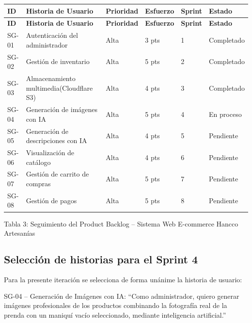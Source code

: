 \documentclass[12pt,a4paper]{article}
\begin{document}
{\small
\begin{longtable}{p{1.2cm} p{6.8cm} p{1.6cm} p{1.8cm} p{1.4cm} p{2.2cm}}
\toprule
\textbf{ID} & \textbf{Historia de Usuario} & \textbf{Prioridad} & \textbf{Esfuerzo} & \textbf{Sprint} & \textbf{Estado} \\
\midrule
\endfirsthead

\toprule
\textbf{ID} & \textbf{Historia de Usuario} & \textbf{Prioridad} & \textbf{Esfuerzo} & \textbf{Sprint} & \textbf{Estado} \\
\midrule
\endhead

\bottomrule
\endlastfoot

SG-01 & Autenticación del administrador & Alta & 3 pts & 1 & Completado \\
SG-02 & Gestión de inventario & Alta & 5 pts & 2 & Completado \\
SG-03 & Almacenamiento multimedia(Cloudflare S3) & Alta & 4 pts & 3 & Completado \\
SG-04 & Generación de imágenes con IA & Alta & 5 pts & 4 & En proceso \\
SG-05 & Generación de descripciones con IA & Alta & 4 pts & 5 & Pendiente \\
SG-06 & Visualización de catálogo & Alta & 4 pts & 6 & Pendiente \\
SG-07 & Gestión de carrito de compras & Alta & 5 pts & 7 & Pendiente \\
SG-08 & Gestión de pagos & Alta & 5 pts & 8 & Pendiente \\

\end{longtable}
}

\begin{center}
\small Tabla 3: Seguimiento del Product Backlog -- Sistema Web E-commerce Hancco Artesanías
\end{center}

\subsection*{Selección de historias para el Sprint 4}

Para la presente iteración se selecciona de forma unánime la historia de usuario:

SG-04 -- Generación de Imágenes con IA: ``Como administrador, quiero generar imágenes profesionales de los productos combinando la fotografía real de la prenda con un maniquí vacío seleccionado, mediante inteligencia artificial.''
\end{document}
